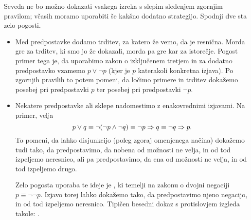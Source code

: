         Seveda ne bo možno dokazati vsakega izreka s slepim sledenjem zgornjim pravilom; včasih moramo uporabiti še kakšno dodatno strategijo. Spodnji dve sta zelo pogosti.
        \begin{itemize}
                \item
                        Med predpostavke dodamo trditev, za katero že vemo, da je resnična. Morda gre za trditev, ki smo jo že dokazali, morda pa gre kar za istorečje. Pogost primer tega je, da uporabimo zakon o izključenem tretjem in za dodatno predpostavko vzamemo $p \lor \lnot{p}$ (kjer je $p$ katerakoli konkretna izjava). Po zgornjih pravilih to potem pomeni, da ločimo primere in trditev dokažemo posebej pri predpostavki $p$ ter posebej pri predpostavki $\lnot{p}$.
                \item
                        Nekatere predpostavke ali sklepe nadomestimo z enakovrednimi izjavami. Na primer, velja
                        \[p \lor q \equiv \lnot(\lnot{p} \land \lnot{q}) \equiv \lnot{p} \Rightarrow q \equiv \lnot{q} \Rightarrow p.\]
                        To pomeni, da lahko disjunkcijo (poleg zgoraj omenjenega načina) dokažemo tudi tako, da predpostavimo, da nobena od možnosti ne velja, in od tod izpeljemo neresnico, ali pa predpostavimo, da ena od možnosti ne velja, in od tod izpeljemo drugo.

                        Zelo pogosta uporaba te ideje je , ki temelji na zakonu o dvojni negaciji $p \equiv \lnot\lnot{p}$. Izjavo torej lahko dokažemo tako, da predpostavimo njeno negacijo, in od tod izpeljemo neresnico. Tipičen besedni dokaz s protislovjem izgleda takole: .
        \end{itemize}



